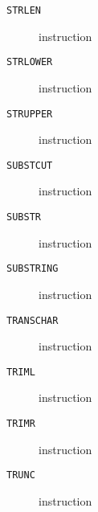 \clearpage
\begin{description}
\item[\texttt{STRLEN}] instruction\\

\end{description}
\clearpage
\begin{description}
\item[\texttt{STRLOWER}] instruction\\

\end{description}
\clearpage
\begin{description}
\item[\texttt{STRUPPER}] instruction\\

\end{description}
\clearpage
\begin{description}
\item[\texttt{SUBSTCUT}] instruction\\

\end{description}
\clearpage
\begin{description}
\item[\texttt{SUBSTR}] instruction\\

\end{description}
\clearpage
\begin{description}
\item[\texttt{SUBSTRING}] instruction\\

\end{description}
\clearpage
\begin{description}
\item[\texttt{TRANSCHAR}] instruction\\

\end{description}
\clearpage
\begin{description}
\item[\texttt{TRIML}] instruction\\

\end{description}
\clearpage
\begin{description}
\item[\texttt{TRIMR}] instruction\\

\end{description}
\clearpage
\begin{description}
\item[\texttt{TRUNC}] instruction\\

\end{description}
\clearpage
